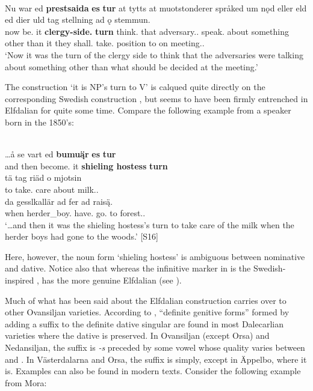 \ea%
\\
\gll Nu  war  ed  \textbf{prestsaida} \textbf{es} \textbf{tur} at  tytts at  muotstonderer  språked  um  nǫd  eller  eld  ed dier  uld  tag  stellning  ad  ǫ  stemmun.\\
now  be.{\pst}  it  \textbf{clergy-side.{}} \textbf{{\poss}} \textbf{turn} {\infm}  think.{\inf} that  adversary.{}.{\pl}  speak.{\pst}  about  something  other  than  it they  shall.{\pst}  take.{\inf} position  to  on  meeting.{}.{\dat}\\
\glt ‘Now it was the turn of the clergy side to think that the adversaries were talking about something other than what should be decided at the meeting.’ 
\z

The construction  ‘it is NP’s turn to V’ is calqued quite directly on the corresponding Swedish construction , but seems to have been firmly entrenched in Elfdalian for quite some time. Compare the following example from a speaker born in the 1850’s:

\ea%
\\
\gll …å  se  vart  ed  \textbf{bumuą̈r} \textbf{es} \textbf{tur}\\
and  then  become.{\pst}  it  \textbf{shieling hostess} \textbf{{\poss}} \textbf{turn}\\
\gll tä  tag  riäd   o  mjotsin\\
to  take.{\inf} care  about  milk.{}.{\dat}\\
\gll da  gesslkallär  ad  fer  ad  raisą̈.\\
when  herder\_boy.{\pl}  have.{\pst}  go.{\supp}  to  forest.{}.{\dat}\\
\glt ‘…and then it was the shieling hostess’s turn to take care of the milk when the herder boys had gone to the woods.’ [S16]
\z

Here, however, the noun form  ‘shieling hostess’ is ambiguous between nominative and dative. Notice also that whereas the infinitive marker in  is the Swedish-inspired ,  has the more genuine Elfdalian  (see ). 

Much of what has been said about the Elfdalian construction carries over to other Ovansiljan varieties. According to \citet[170]{Levander1928}, “definite genitive forms” formed by adding a suffix to the definite dative singular are found in most Dalecarlian varieties where the dative is preserved. In Ovansiljan (except Orsa) and Nedansiljan, the suffix is\textit{ {}-s} preceded by some vowel whose quality varies between  and . In Västerdalarna and Orsa, the suffix is simply, except in Äppelbo, where it is. Examples can also be found in modern texts. Consider the following example from Mora:

